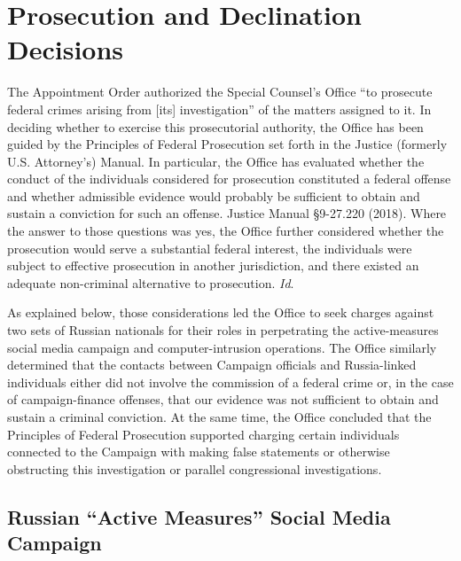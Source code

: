 \section{Prosecution and Declination Decisions}

The Appointment Order authorized the Special Counsel's Office ``to prosecute federal crimes arising from [its] investigation'' of the matters assigned to it.
In deciding whether to exercise this prosecutorial authority, the Office has been guided by the Principles of Federal Prosecution set forth in the Justice (formerly U.S. Attorney's) Manual.
In particular, the Office has evaluated whether the conduct of the individuals considered for prosecution constituted a federal offense and whether admissible evidence would probably be sufficient to obtain and sustain a conviction for such an offense.
Justice Manual \S 9-27.220 (2018).
Where the answer to those questions was yes, the Office further considered whether the prosecution would serve a substantial federal interest, the individuals were subject to effective prosecution in another jurisdiction, and there existed an adequate non-criminal alternative to prosecution.
\textit{Id}.

As explained below, those considerations led the Office to seek charges against two sets of Russian nationals for their roles in perpetrating the active-measures social media campaign and computer-intrusion operations.
The Office similarly determined that the contacts between Campaign officials and Russia-linked individuals either did not involve the commission of a federal crime or, in the case of campaign-finance offenses, that our evidence was not sufficient to obtain and sustain a criminal conviction.
At the same time, the Office concluded that the Principles of Federal Prosecution supported charging certain individuals connected to the Campaign with making false statements or otherwise obstructing this investigation or parallel congressional investigations.

\subsection{Russian ``Active Measures'' Social Media Campaign}

